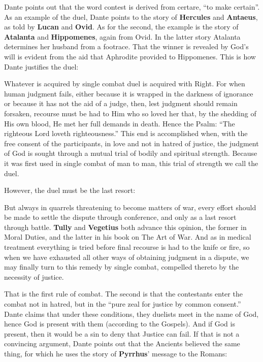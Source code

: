Dante points out that the word contest is derived from certare, ``to make certain''. As an example of the duel, Dante points to the story of \textbf{Hercules} and \textbf{Antaeus}, as told by \textbf{Lucan} and \textbf{Ovid}. As for the second, the example is the story of \textbf{Atalanta} and \textbf{Hippomenes}, again from Ovid. In the latter story Atalanta determines her husband from a footrace. That the winner is revealed by God's will is evident from the aid that Aphrodite provided to Hippomenes. This is how Dante justifies the duel:

\begin{quotex}
Whatever is acquired by single combat duel is acquired with Right. For when human judgment fails, either because it is wrapped in the darkness of ignorance or because it has not the aid of a judge, then, lest judgment should remain forsaken, recourse must be had to Him who so loved her that, by the shedding of His own blood, He met her full demands in death. Hence the Psalm: ``The righteous Lord loveth righteousness.'' This end is accomplished when, with the free consent of the participants, in love and not in hatred of justice, the judgment of God is sought through a mutual trial of bodily and spiritual strength. Because it was first used in single combat of man to man, this trial of strength we call the duel.
\end{quotex}


However, the duel must be the last resort:

\begin{quotex}
But always in quarrels threatening to become matters of war, every effort should be made to settle the dispute through conference, and only as a last resort through battle. \textbf{Tully} and \textbf{Vegetius} both advance this opinion, the former in Moral Duties, and the latter in his book on The Art of War. And as in medical treatment everything is tried before final recourse is had to the knife or fire, so when we have exhausted all other ways of obtaining judgment in a dispute, we may finally turn to this remedy by single combat, compelled thereto by the necessity of justice.
\end{quotex}


That is the first rule of combat. The second is that the contestants enter the combat not in hatred, but in the ``pure zeal for justice by common consent.'' Dante claims that under these conditions, they duelists meet in the name of God, hence God is present with them (according to the Gospels). And if God is present, then it would be a sin to deny that Justice can fail. If that is not a convincing argument, Dante points out that the Ancients believed the same thing, for which he uses the story of \textbf{Pyrrhus}' message to the Romans:

